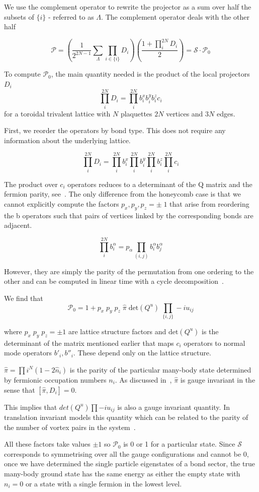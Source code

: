 We use the complement operator to rewrite the projector as a sum over half the subsets of \(\{i\}\) - referred to as \(\Lambda\). The complement operator deals with the other half

\[ \mathcal{P} =  \left( \frac{1}{2^{2N-1}} \sum_{\Lambda} \prod_{i\in\{i\}} D_i\right) \left(\frac{1 + \prod_i^{2N} D_i}{2}\right) = \mathcal{S} \cdot \mathcal{P}_0\]

To compute \(\mathcal{P}_0\), the main quantity needed is the product of the local projectors \(D_i\) \[\prod_i^{2N} D_i = \prod_i^{2N} b^x_i b^y_i b^z_i c_i \] for a toroidal trivalent lattice with \(N\) plaquettes \(2N\) vertices and \(3N\) edges.

First, we reorder the operators by bond type. This does not require any information about the underlying lattice.

\[\prod_i^{2N} D_i = \prod_i^{2N} b^x_i \prod_i^{2N} b^y_i \prod_i^{2N} b^z_i \prod_i^{2N} c_i\]

The product over \(c_i\) operators reduces to a determinant of the Q matrix and the fermion parity, see~\autocite{pedrocchiPhysicalSolutionsKitaev2011}. The only difference from the honeycomb case is that we cannot explicitly compute the factors \(p_x,p_y,p_z = \pm\;1\) that arise from reordering the b operators such that pairs of vertices linked by the corresponding bonds are adjacent.

\[\prod_i^{2N} b^\alpha_i = p_\alpha \prod_{(i,j)}b^\alpha_i b^\alpha_j\]

However, they are simply the parity of the permutation from one ordering to the other and can be computed in linear time with a cycle decomposition~\autocite{sedgewickPermutationGenerationMethods1977}.

We find that \[\mathcal{P}_0 = 1 + p_x\;p_y\;p_z\; \hat{\pi} \; \mathrm{det}(Q^u) \; \prod_{\{i,j\}} -iu_{ij}\]

where \(p_x\;p_y\;p_z = \pm 1\) are lattice structure factors and \(\mathrm{det}(Q^u)\) is the determinant of the matrix mentioned earlier that maps \(c_i\) operators to normal mode operators \(b'_i, b''_i\). These depend only on the lattice structure.

\(\hat{\pi} = \prod{i}^{N} (1 - 2\hat{n}_i)\) is the parity of the particular many-body state determined by fermionic occupation numbers \(n_i\). As discussed in~\autocite{pedrocchiPhysicalSolutionsKitaev2011}, \(\hat{\pi}\) is gauge invariant in the sense that \([\hat{\pi}, D_i] = 0\).

This implies that \(det(Q^u) \prod -i u_{ij}\) is also a gauge invariant quantity. In translation invariant models this quantity which can be related to the parity of the number of vortex pairs in the system~\autocite{yaoAlgebraicSpinLiquid2009}.

All these factors take values \(\pm 1\) so \(\mathcal{P}_0\) is 0 or 1 for a particular state. Since \(\mathcal{S}\) corresponds to symmetrising over all the gauge configurations and cannot be 0, once we have determined the single particle eigenstates of a bond sector, the true many-body ground state has the same energy as either the empty state with \(n_i = 0\) or a state with a single fermion in the lowest level.
